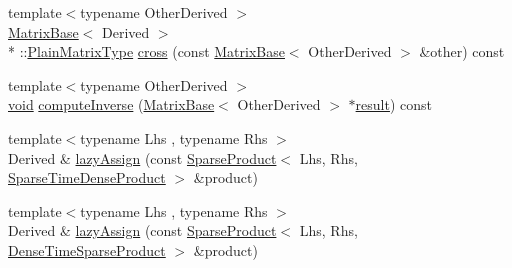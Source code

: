 \begin{DoxyCompactItemize}
\item 
{\footnotesize template$<$typename Other\-Derived $>$ }\\\hyperlink{class_matrix_base}{Matrix\-Base}$<$ Derived $>$\\*
\-::\hyperlink{class_matrix_base_aa6a23b3d1aac2a1b4b9d8bcb54e1e2bc}{Plain\-Matrix\-Type} \hyperlink{class_matrix_base_a8c63424935f93df8ae2d5d0473023d89}{cross} (const \hyperlink{class_matrix_base}{Matrix\-Base}$<$ Other\-Derived $>$ \&other) const 
\item 
{\footnotesize template$<$typename Other\-Derived $>$ }\\\hyperlink{group___u_a_v_objects_plugin_ga444cf2ff3f0ecbe028adce838d373f5c}{void} \hyperlink{class_matrix_base_afdcd7ce883fc5f60989a0dfef920dbfc}{compute\-Inverse} (\hyperlink{class_matrix_base}{Matrix\-Base}$<$ Other\-Derived $>$ $\ast$\hyperlink{qxtslotjob_8h_aab161efab0511ea9612b64c40e9852ca}{result}) const 
\item 
{\footnotesize template$<$typename Lhs , typename Rhs $>$ }\\Derived \& \hyperlink{class_matrix_base_a309fff3a06ecb555faf41fe15daec70f}{lazy\-Assign} (const \hyperlink{class_sparse_product}{Sparse\-Product}$<$ Lhs, Rhs, \hyperlink{_constants_8h_a19539c4a85742928cd91d83569d63c06ac0beebcaabbb5b076c5709ce0848b122}{Sparse\-Time\-Dense\-Product} $>$ \&product)
\item 
{\footnotesize template$<$typename Lhs , typename Rhs $>$ }\\Derived \& \hyperlink{class_matrix_base_adb572962f0cde833fd4ef31a6d9a9efe}{lazy\-Assign} (const \hyperlink{class_sparse_product}{Sparse\-Product}$<$ Lhs, Rhs, \hyperlink{_constants_8h_a19539c4a85742928cd91d83569d63c06afde1e002b9d507b2fcaa6e02d9e08141}{Dense\-Time\-Sparse\-Product} $>$ \&product)
\end{DoxyCompactItemize}
